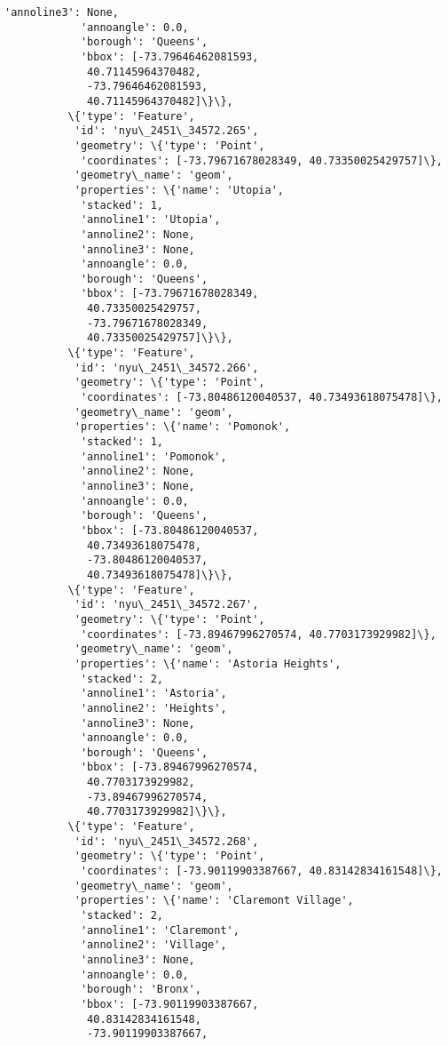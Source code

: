 \documentclass[11pt]{article}
\begin{document}
\begin{Verbatim}[commandchars=\\\{\}]
            'annoline3': None,
            'annoangle': 0.0,
            'borough': 'Queens',
            'bbox': [-73.79646462081593,
             40.71145964370482,
             -73.79646462081593,
             40.71145964370482]\}\},
          \{'type': 'Feature',
           'id': 'nyu\_2451\_34572.265',
           'geometry': \{'type': 'Point',
            'coordinates': [-73.79671678028349, 40.73350025429757]\},
           'geometry\_name': 'geom',
           'properties': \{'name': 'Utopia',
            'stacked': 1,
            'annoline1': 'Utopia',
            'annoline2': None,
            'annoline3': None,
            'annoangle': 0.0,
            'borough': 'Queens',
            'bbox': [-73.79671678028349,
             40.73350025429757,
             -73.79671678028349,
             40.73350025429757]\}\},
          \{'type': 'Feature',
           'id': 'nyu\_2451\_34572.266',
           'geometry': \{'type': 'Point',
            'coordinates': [-73.80486120040537, 40.73493618075478]\},
           'geometry\_name': 'geom',
           'properties': \{'name': 'Pomonok',
            'stacked': 1,
            'annoline1': 'Pomonok',
            'annoline2': None,
            'annoline3': None,
            'annoangle': 0.0,
            'borough': 'Queens',
            'bbox': [-73.80486120040537,
             40.73493618075478,
             -73.80486120040537,
             40.73493618075478]\}\},
          \{'type': 'Feature',
           'id': 'nyu\_2451\_34572.267',
           'geometry': \{'type': 'Point',
            'coordinates': [-73.89467996270574, 40.7703173929982]\},
           'geometry\_name': 'geom',
           'properties': \{'name': 'Astoria Heights',
            'stacked': 2,
            'annoline1': 'Astoria',
            'annoline2': 'Heights',
            'annoline3': None,
            'annoangle': 0.0,
            'borough': 'Queens',
            'bbox': [-73.89467996270574,
             40.7703173929982,
             -73.89467996270574,
             40.7703173929982]\}\},
          \{'type': 'Feature',
           'id': 'nyu\_2451\_34572.268',
           'geometry': \{'type': 'Point',
            'coordinates': [-73.90119903387667, 40.83142834161548]\},
           'geometry\_name': 'geom',
           'properties': \{'name': 'Claremont Village',
            'stacked': 2,
            'annoline1': 'Claremont',
            'annoline2': 'Village',
            'annoline3': None,
            'annoangle': 0.0,
            'borough': 'Bronx',
            'bbox': [-73.90119903387667,
             40.83142834161548,
             -73.90119903387667,

\end{Verbatim}
\end{document}
